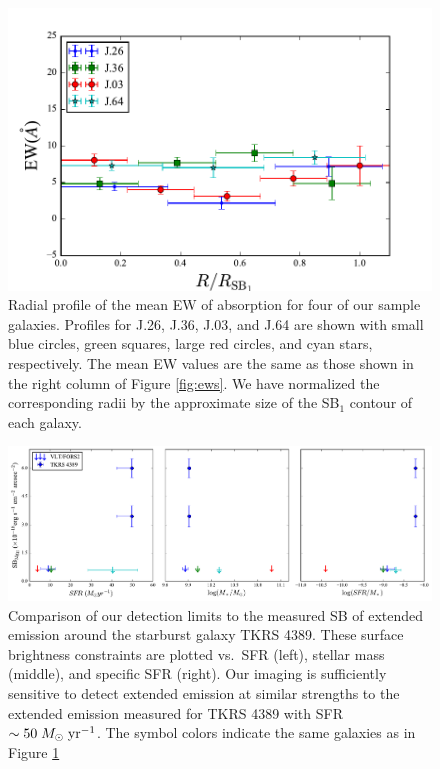\documentclass[twocolumn]{aastex62}
\def \msunperyr {{\; M_{\odot}\rm \;yr^{-1}}}
\begin{document}
\begin{figure}[!htb]
\centering
\includegraphics[scale=0.7]{ew_comb.pdf}
\caption{Radial profile of the mean EW of  absorption for four of our sample galaxies. Profiles for J.26,  J.36,  J.03, and J.64 are shown with small blue circles, green squares, large red circles, and cyan stars, respectively. The mean EW values are the same as those shown in the right column of Figure \ref{fig:ews}. We have normalized the corresponding radii by the approximate size of the SB$_1$ contour of each galaxy.}
\label{fig:ew_comb}
\end{figure}

\begin{figure}[!htb]
\centering
\includegraphics[scale=0.57]{all_limitsv2.pdf}
\caption{Comparison of our detection limits to the measured SB of extended  emission around the starburst galaxy TKRS 4389. %
These surface brightness constraints are plotted vs.\ SFR (left), stellar mass (middle), and specific SFR (right).
Our imaging is sufficiently sensitive to detect extended emission at similar strengths to the extended emission measured for TKRS 4389 with SFR $\sim 50 \msunperyr$. The symbol colors indicate the same galaxies as in Figure \ref{fig:ew_comb}}
\label{fig:all_limits}
\end{figure}
\end{document}
